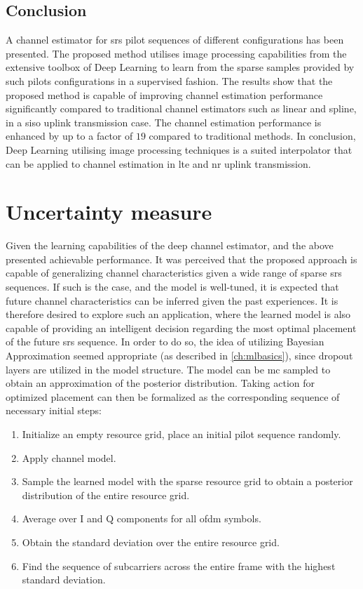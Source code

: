 \subsection{Conclusion}
A channel estimator for \gls{srs} pilot sequences of different configurations has been presented. The proposed method utilises image processing capabilities from the extensive toolbox of Deep Learning to learn from the sparse samples provided by such pilots configurations in a supervised fashion. The results show that the proposed method is capable of improving channel estimation performance significantly compared to traditional channel estimators such as linear and spline, in a \gls{siso} uplink transmission case. The channel estimation performance is enhanced by up to a factor of $19$ compared to traditional methods. In conclusion, Deep Learning utilising image processing techniques is a suited interpolator that can be applied to channel estimation in \gls{lte} and \gls{nr} uplink transmission.

\section{Uncertainty measure}
Given the learning capabilities of the deep channel estimator, and the above presented achievable performance. It was perceived that the proposed approach is capable of generalizing channel characteristics given a wide range of sparse \gls{srs} sequences. If such is the case, and the model is well-tuned, it is expected that future channel characteristics can be inferred given the past experiences. It is therefore desired to explore such an application, where the learned model is also capable of providing an intelligent decision regarding the most optimal placement of the future \gls{srs} sequence. In order to do so, the idea of utilizing Bayesian Approximation seemed appropriate (as described in \ref{ch:mlbasics}), since dropout layers are utilized in the model structure. The model can be \gls{mc} sampled to obtain an approximation of the posterior distribution. Taking action for optimized placement can then be formalized as the corresponding sequence of necessary initial steps:

\begin{enumerate}
    \item Initialize an empty resource grid, place an initial pilot sequence randomly.
    \item Apply channel model.
    \item Sample the learned model with the sparse resource grid to obtain a posterior distribution of the entire resource grid.
    \item Average over I and Q components for all \gls{ofdm} symbols.
    \item Obtain the standard deviation over the entire resource grid.
    \item Find the sequence of subcarriers across the entire frame with the highest standard deviation.
\end{enumerate}

